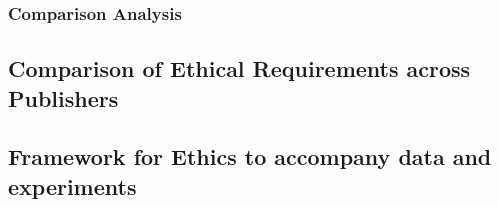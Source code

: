 \subsubsection{Comparison Analysis}












\subsection{Comparison of Ethical Requirements across Publishers}

\subsection{Framework for Ethics to accompany data and experiments}

